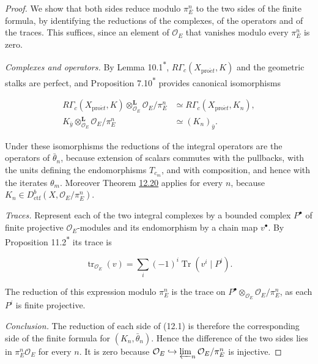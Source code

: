 \documentclass[11pt]{article}
\newcommand{\bpout}[1]{#1\textsuperscript{\hyperlink{bp-outside}{\ensuremath{\ast}}}}
\begin{document}
\begin{proof}[{Proof}]\label{bp67}%
We show that both sides reduce modulo \(\pi_E^n\) to the two sides of the finite formula, by identifying the reductions of the complexes, of the operators and of the traces. This suffices, since an element of \(\mathcal O_E\) that vanishes modulo every \(\pi_E^n\) is zero.

\emph{Complexes and operators.} By Lemma \bpout{10.1}, \(R\Gamma_c(X_{\mathrm{pro}\acute{e}t},K)\) and the geometric stalks are perfect, and Proposition \bpout{7.10} provides canonical isomorphisms

\[
\begin{aligned}
R\Gamma_c(X_{\mathrm{pro}\acute{e}t},K)\otimes^{\mathbf L}_{\mathcal O_E}\mathcal O_E/\pi_E^n
&\simeq R\Gamma_c(X_{\mathrm{pro}\acute{e}t},K_n),\\
K_{\bar y}\otimes^{\mathbf L}_{\mathcal O_E}\mathcal O_E/\pi_E^n&\simeq(K_n)_{\bar y}.
\end{aligned}
\]

Under these isomorphisms the reductions of the integral operators are the operators of \(\bar\theta_n\), because extension of scalars commutes with the pullbacks, with the units defining the endomorphisms \(T_{c_m}\), and with composition, and hence with the iterates \(\theta_m\). Moreover Theorem \hyperref[bp62]{12.20} applies for every \(n\), because \(K_n\in D^b_{\mathrm{ctf}}(X,\mathcal O_E/\pi_E^n)\).

\emph{Traces.} Represent each of the two integral complexes by a bounded complex \(P^\bullet\) of finite projective \(\mathcal O_E\)-modules and its endomorphism by a chain map \(v^\bullet\). By Proposition \bpout{11.2} its trace is

\[
\operatorname{tr}_{\mathcal O_E}(v)
=\sum_i(-1)^i\operatorname{Tr}(v^i\mid P^i).
\]

The reduction of this expression modulo \(\pi_E^n\) is the trace on \(P^\bullet\otimes_{\mathcal O_E}\mathcal O_E/\pi_E^n\), as each \(P^i\) is finite projective.

\emph{Conclusion.} The reduction of each side of (12.1) is therefore the corresponding side of the finite formula for \((K_n,\bar\theta_n)\). Hence the difference of the two sides lies in \(\pi_E^n\mathcal O_E\) for every \(n\). It is zero because \(\mathcal O_E\hookrightarrow\varprojlim_n\mathcal O_E/\pi_E^n\) is injective.
\end{proof}
\end{document}
